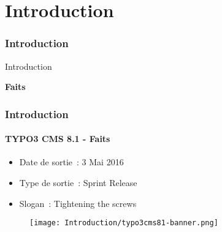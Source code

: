 %

\section{Introduction}
\begin{frame}[fragile]
	\frametitle{Introduction}

	\begin{center}\huge{Introduction}\end{center}
	\begin{center}\huge{\color{typo3darkgrey}\textbf{Faits}}\end{center}

\end{frame}

\begin{frame}[fragile]
	\frametitle{Introduction}
	\framesubtitle{TYPO3 CMS 8.1 - Faits}

	\begin{itemize}
		\item Date de sortie~: 3 Mai 2016
		\item Type de sortie~: Sprint Release
		\item Slogan~: Tightening the screws
	\end{itemize}

	\begin{figure}
		\texttt{[image: Introduction/typo3cms81-banner.png]}
	\end{figure}

\end{frame}

